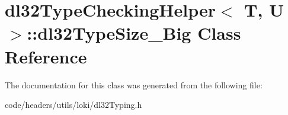 \hypertarget{classdl32_type_checking_helper_1_1dl32_type_size___big}{\section{dl32\-Type\-Checking\-Helper$<$ T, U $>$\-:\-:dl32\-Type\-Size\-\_\-\-Big Class Reference}
\label{classdl32_type_checking_helper_1_1dl32_type_size___big}
}


The documentation for this class was generated from the following file\-:\begin{DoxyCompactItemize}
\item 
code/headers/utils/loki/dl32\-Typing.\-h\end{DoxyCompactItemize}

